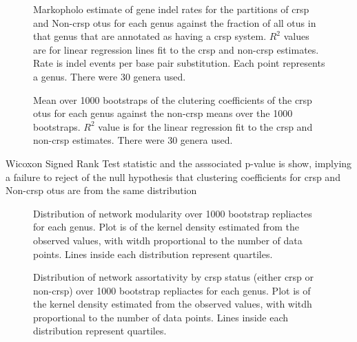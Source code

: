 \FloatBarrier
\begin{figure}[htb!]
    \caption{Markopholo estimate of gene indel rates for the partitions of \ac{crsp} and Non-\ac{crsp} \ac{otu}s for each genus against the fraction of all \ac{otu}s in that genus that are annotated as having a \ac{crsp} system. $R^2$ values are for linear regression lines fit to the \ac{crsp} and non-\ac{crsp} estimates. Rate is indel events per base pair substitution. Each point represents a genus. There were 30 genera used.}
\end{figure}
\FloatBarrier
\FloatBarrier
\begin{figure}[htb!]
    \caption{Mean over 1000 bootstraps of the clutering coefficients of the \ac{crsp} \ac{otu}s for each genus against the non-\ac{crsp} means over the 1000 bootstraps. $R^2$ value is for the linear regression fit to the \ac{crsp} and non-\ac{crsp} estimates. There were 30 genera used.}
\end{figure}
\FloatBarrier
Wicoxon Signed Rank Test statistic and the asssociated p-value is show, implying a failure to reject of the null hypothesis that clustering coefficients for \ac{crsp} and Non-\ac{crsp} \ac{otu}s are from the same distribution
\FloatBarrier
\begin{figure}[htb!]
    \caption{Distribution of network modularity over 1000 bootstrap repliactes for each genus. Plot is of the kernel density estimated from the observed values, with witdh proportional to the number of data points. Lines inside each distribution represent quartiles.}
\end{figure}
\FloatBarrier
\FloatBarrier
\begin{figure}[htb!]
    \caption{Distribution of network assortativity by \ac{crsp} status (either \ac{crsp} or non-\ac{crsp}) over 1000 bootstrap repliactes for each genus. Plot is of the kernel density estimated from the observed values, with witdh proportional to the number of data points. Lines inside each distribution represent quartiles.}
\end{figure}
\FloatBarrier
